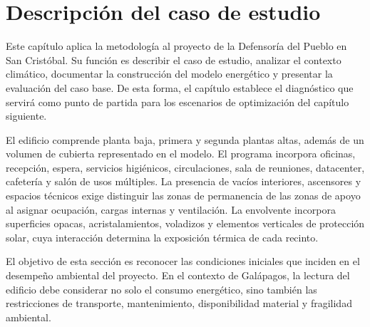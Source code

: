 
\section{Descripción del caso de estudio}

\begin{textoDosTercios}
Este capítulo aplica la metodología al proyecto de la Defensoría del Pueblo en San Cristóbal. Su función es describir el caso de estudio, analizar el contexto climático, documentar la construcción del modelo energético y presentar la evaluación del caso base. De esta forma, el capítulo establece el diagnóstico que servirá como punto de partida para los escenarios de optimización del capítulo siguiente.

El edificio comprende planta baja, primera y segunda plantas altas, además de un volumen de cubierta representado en el modelo. El programa incorpora oficinas, recepción, espera, servicios higiénicos, circulaciones, sala de reuniones, datacenter, cafetería y salón de usos múltiples. La presencia de vacíos interiores, ascensores y espacios técnicos exige distinguir las zonas de permanencia de las zonas de apoyo al asignar ocupación, cargas internas y ventilación. La envolvente incorpora superficies opacas, acristalamientos, voladizos y elementos verticales de protección solar, cuya interacción determina la exposición térmica de cada recinto.

El objetivo de esta sección es reconocer las condiciones iniciales que inciden en el desempeño ambiental del proyecto. En el contexto de Galápagos, la lectura del edificio debe considerar no solo el consumo energético, sino también las restricciones de transporte, mantenimiento, disponibilidad material y fragilidad ambiental.
\end{textoDosTercios}


\par\medskip

